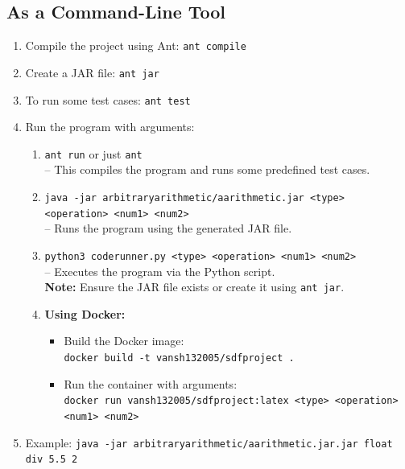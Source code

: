 \documentclass[12pt]{article}
\begin{document}
\subsection{As a Command-Line Tool}
\begin{enumerate}
    \item Compile the project using Ant: \texttt{ant compile}
    \item Create a JAR file: \texttt{ant jar}
    \item To run some test cases: \texttt{ant test}
    \item Run the program with arguments:
    \begin{enumerate}
        \item[\textbf{a.}] \texttt{ant run} or just \texttt{ant} \\
        \hspace*{1em}-- This compiles the program and runs some predefined test cases.
        \item[\textbf{b.}] \texttt{java -jar arbitraryarithmetic/aarithmetic.jar <type> <operation> <num1> <num2>} \\
        \hspace*{1em}-- Runs the program using the generated JAR file.
        \item[\textbf{c.}] \texttt{python3 coderunner.py <type> <operation> <num1> <num2>} \\
        \hspace*{1em}-- Executes the program via the Python script.\\
        \textbf{Note:} Ensure the JAR file exists or create it using \texttt{ant jar}.
        \item[\textbf{d.}] \textbf{Using Docker:}
        \begin{itemize}
            \item Build the Docker image: \\
            \texttt{docker build -t vansh132005/sdfproject .}
            \item Run the container with arguments: \\
            \texttt{docker run vansh132005/sdfproject:latex <type> <operation> <num1> <num2>}
        \end{itemize}
    \end{enumerate}
    \item Example: \texttt{java -jar arbitraryarithmetic/aarithmetic.jar.jar float div 5.5 2}
\end{enumerate}
\end{document}
